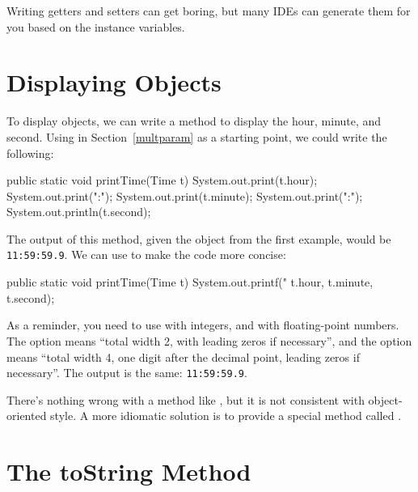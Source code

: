Writing getters and setters can get boring, but many IDEs can generate them for you based on the instance variables.



\section{Displaying Objects}

To display  objects, we can write a method to display the hour, minute, and second.
Using  in Section~\ref{multparam} as a starting point, we could write the following:


\begin{code}
public static void printTime(Time t) {
    System.out.print(t.hour);
    System.out.print(":");
    System.out.print(t.minute);
    System.out.print(":");
    System.out.println(t.second);
}
\end{code}

The output of this method, given the  object from the first example, would be {\tt 11:59:59.9}.
We can use  to make the code more concise:


\begin{code}
public static void printTime(Time t) {
    System.out.printf("%
        t.hour, t.minute, t.second);
}
\end{code}

As a reminder, you need to use  with integers, and  with floating-point numbers.
The  option means ``total width 2, with leading zeros if necessary'', and the  option means ``total width 4, one digit after the decimal point, leading zeros if necessary''.
The output is the same: {\tt 11:59:59.9}.

There's nothing wrong with a method like , but it is not consistent with object-oriented style.
A more idiomatic solution is to provide a special method called .


\section{The toString Method}

